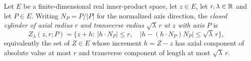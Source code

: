 \begin{definition}
Let $E$ be a finite-dimensional real inner-product space, let $z\in E$, let
$r,\lambda\in\mathbb{R}$ and let $P\in E$. Writing $N_P=P/|P|$ for the normalized axis
direction, the \emph{closed cylinder of axial radius $r$ and transverse radius
$\sqrt\lambda\,r$ at $z$ with axis $P$} is
\[
  Z_\lambda(z,r;P)
   =\bigl\{z+h:\ |h\cdot N_P|\le r,\quad
               |h-(h\cdot N_P)N_P|\le\sqrt\lambda\,r\bigr\},
\]
equivalently the set of $Z\in E$ whose increment $h=Z-z$ has axial component of
absolute value at most $r$ and transverse component of length at most
$\sqrt\lambda\,r$.
\end{definition}
